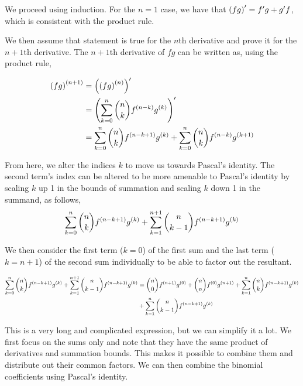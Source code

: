 \documentclass{article}
\begin{document}
We proceed using induction.
For the $n=1$ case, we have that $\left (fg \right)' = f'g + g'f$, which is consistent with the product rule.

We then assume that statement is true for the $n$th derivative and prove it for the $n+1$th derivative.
The $n+1$th derivative of $fg$ can be written as, using the product rule,

\begin{align*}
  \left (fg \right)^{\left (n+1 \right)} &= \left (\left (fg \right)^{\left (n \right)} \right)' \\
                         &= \left (\sum \limits_{k=0}^n \binom{n}{k}f^{(n-k)}g^{(k)} \right) ' \\
                         &= \sum \limits_{k=0}^n \binom{n}{k} f^{\left (n-k+1 \right)} g^{\left (k \right)} + \sum \limits_{k=0}^n \binom{n}{k} f^{\left (n-k \right)} g^{\left (k+1 \right)}
\end{align*}

From here, we alter the indices $k$ to move us towards Pascal's identity.
The second term's index can be altered to be more amenable to Pascal's identity by scaling $k$ up 1 in the bounds of summation and scaling $k$ down 1 in the summand, as follows,
$$
\sum \limits_{k=0}^n \binom{n}{k} f^{\left (n-k+1 \right)} g^{\left (k \right)} + \sum \limits_{k=1}^{n+1} \binom{n}{k-1} f^{\left (n-k+1 \right)} g^{\left (k \right)}
$$

We then consider the first term ($k=0$) of the first sum and the last term ($k=n+1$) of the second sum individually to be able to factor out the resultant.

\begin{align*}
  \sum \limits_{k=0}^n \binom{n}{k} f^{\left (n-k+1 \right)} g^{\left (k \right)} + \sum \limits_{k=1}^{n+1} \binom{n}{k-1} f^{\left (n-k+1 \right)} g^{\left (k \right)} &= \binom{n}{0} f^{\left (n+1 \right)} g^{\left (0 \right)} + \binom{n}{n} f^{\left (0 \right)} g^{\left (n+1 \right)} + \sum \limits_{k=1}^n \binom{n}{k} f^{\left (n-k+1 \right)} g^{\left (k \right)} \\
                                                                                                                                          &+ \sum \limits_{k=1}^{n} \binom{n}{k-1} f^{\left (n-k+1 \right)} g^{\left (k \right)}
\end{align*}

This is a very long and complicated expression, but we can simplify it a lot.
We first focus on the sums only and note that they have the same product of derivatives and summation bounds.
This makes it possible to combine them and distribute out their common factors.
We can then combine the binomial coefficients using Pascal's identity.
\end{document}
